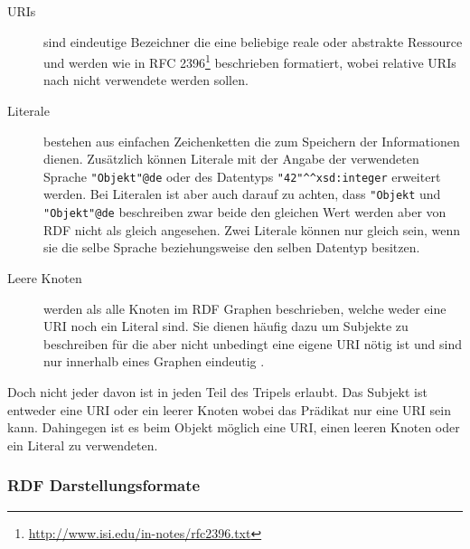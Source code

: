 \begin{description}
    \item[URIs] sind eindeutige Bezeichner die eine beliebige reale oder abstrakte Ressource und werden wie in RFC 2396\footnote{\url{http://www.isi.edu/in-notes/rfc2396.txt}} beschrieben formatiert, wobei relative URIs nach \cite{Klyne2004} nicht verwendete werden sollen.
    \item[Literale] bestehen aus einfachen Zeichenketten die zum Speichern der Informationen dienen. Zusätzlich können Literale mit der Angabe der verwendeten Sprache \lstinline[basicstyle=\ttfamily]{"Objekt"@de} oder des Datentyps \lstinline[basicstyle=\ttfamily]{"42"^^xsd:integer} erweitert werden. Bei Literalen ist aber auch darauf zu achten, dass \lstinline[basicstyle=\ttfamily]{"Objekt} und \lstinline[basicstyle=\ttfamily]{"Objekt"@de} beschreiben zwar beide den gleichen Wert werden aber von RDF nicht als gleich angesehen. Zwei Literale können nur gleich sein, wenn sie die selbe Sprache beziehungsweise den selben Datentyp besitzen.  
    \item[Leere Knoten] werden als alle Knoten im RDF Graphen beschrieben, welche weder eine URI noch ein Literal sind. Sie dienen häufig dazu um Subjekte zu beschreiben für die aber nicht unbedingt eine eigene URI nötig ist und sind nur innerhalb eines Graphen eindeutig .
\end{description}

Doch nicht jeder davon ist in jeden Teil des Tripels erlaubt. Das Subjekt ist entweder eine URI oder ein leerer Knoten wobei das Prädikat nur eine URI sein kann. Dahingegen ist es beim Objekt möglich eine URI, einen leeren Knoten oder ein Literal zu verwendeten. 

\subsubsection{RDF Darstellungsformate} %
\label{ssub:rdf_xml_n3}

